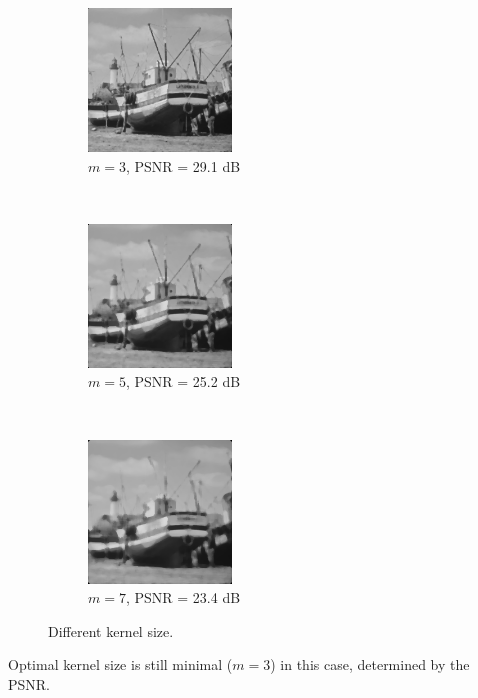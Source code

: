 \documentclass[12pt]{article}
\begin{document}
\begin{figure}[ht!]
    \centering
    \begin{subfigure}[t]{0.3\textwidth}
        \centering
        \includegraphics[height=1.5in]{images/Rs}
        \caption{$m=3$, PSNR = 29.1 dB}
    \end{subfigure}%
    ~ 
    \begin{subfigure}[t]{0.3\textwidth}
        \centering
        \includegraphics[height=1.5in]{images/Rs_5}
        \caption{$m=5$, PSNR = 25.2 dB}
    \end{subfigure}%
    ~
    \begin{subfigure}[t]{0.3\textwidth}
        \centering
        \includegraphics[height=1.5in]{images/Rs_7}
        \caption{$m=7$, PSNR = 23.4 dB}
    \end{subfigure}
    \caption{Different kernel size.}
    \label{fig:s_ksz}
\end{figure}

Optimal kernel size is still minimal ($m=3$) in this case, determined by the PSNR.

\newpage
\end{document}
